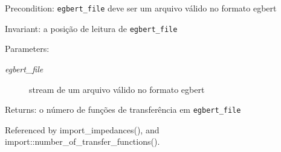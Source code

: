 \begin{Desc}
\item[Precondition:]{\tt egbert\_\-file} deve ser um arquivo válido no formato egbert \end{Desc}
\begin{Desc}
\item[Invariant:]a posição de leitura de {\tt egbert\_\-file} \end{Desc}
\begin{Desc}
\item[Parameters:]
\begin{description}
\item[{\em egbert\_\-file}]stream de um arquivo válido no formato egbert\end{description}
\end{Desc}
\begin{Desc}
\item[Returns:]o número de funções de transferência em {\tt egbert\_\-file} \end{Desc}


Referenced by import\_\-impedances(), and import::number\_\-of\_\-transfer\_\-functions().